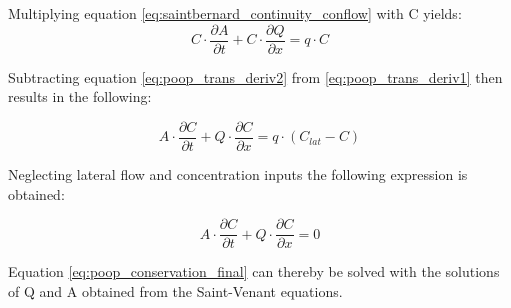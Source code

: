 Multiplying equation \ref{eq:saintbernard_continuity_conflow} with C yields:
\begin{equation}
	C \cdot \frac{\partial A}{\partial t} + C \cdot \frac{\partial Q}{\partial x} = q \cdot C
	\label{eq:poop_trans_deriv2} 
\end{equation} 

Subtracting equation \ref{eq:poop_trans_deriv2} from \ref{eq:poop_trans_deriv1} then results in the following:

\begin{equation}
	A \cdot \frac{\partial C}{\partial t} + Q \cdot \frac{\partial C}{\partial x} = q \cdot (C_{lat}-C)
	\label{eq:poop_conservation_semi_final} 
\end{equation} 

Neglecting lateral flow and concentration inputs the following expression is obtained:

\begin{equation}
\boxed{	A \cdot \frac{\partial C}{\partial t} + Q \cdot \frac{\partial C}{\partial x} = 0}
	\label{eq:poop_conservation_final} 
\end{equation} 

Equation \ref{eq:poop_conservation_final} can thereby be solved with the solutions of Q and A obtained from the Saint-Venant equations.